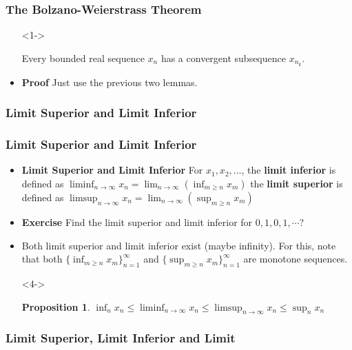 \documentclass[handout]{beamer}
\newtheorem{Proposition}[theorem]{Proposition}
\begin{document}
\frame
{
  \frametitle{The Bolzano-Weierstrass Theorem}

  \begin{itemize}
  \item [] <1-> \begin{Theorem} Every bounded real sequence $x_n$ has a convergent subsequence $x_{n_k}$. \end{Theorem} 
  
  \item<2-> \textbf{Proof} Just use the previous two lemmas.
  
  
  \end{itemize}
}


\subsubsection{Limit Superior and Limit Inferior}

\frame
{
  \frametitle{Limit Superior and Limit Inferior}

   \begin{itemize}
  \item<1-> \textbf{Limit Superior and Limit Inferior} For $x_1,x_2,\ldots$, the \textbf{limit inferior} is defined as $\liminf_{n\rightarrow \infty} x_n=\lim_{n\rightarrow \infty} (\inf_{m\geq n} x_m)$  the  \textbf{limit superior} is defined as $\limsup_{n\rightarrow \infty} x_n=\lim_{n\rightarrow \infty} (\sup_{m\geq n} x_m)$
  
      \item<2-> \textbf{Exercise} Find the limit superior and limit inferior for $0,1,0,1,\cdots$?
  
    \item<3-> Both limit superior and limit inferior exist (maybe infinity). For this, note that both $\{\inf_{m\geq n} x_m\}_{n=1}^\infty$ and $\{\sup_{m\geq n} x_m\}_{n=1}^\infty$ are monotone sequences. 
      
   \item[]<4-> \begin{Proposition}  $\inf_{n} x_n \leq \liminf_{n\rightarrow \infty} x_n\leq \limsup_{n\rightarrow \infty} x_n\leq \sup_{n} x_n$\end{Proposition} 
   

  \end{itemize}
}

\subsubsection{Limit Superior, Limit Inferior and Limit}
\end{document}
